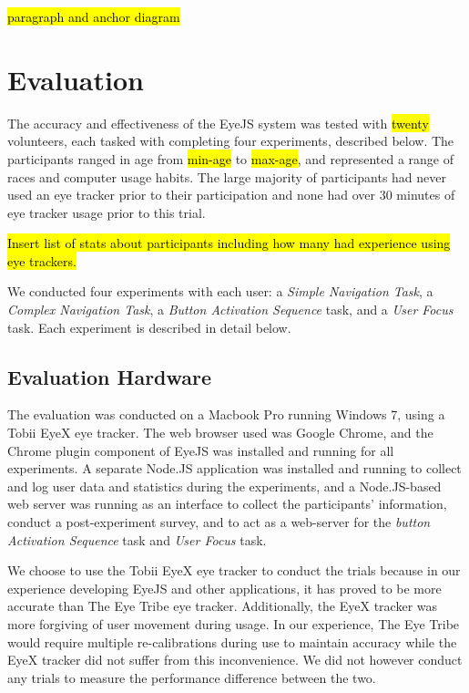 \documentclass{sigchi}
\begin{document}
\hl{paragraph and anchor diagram}



\section{Evaluation}
The accuracy and effectiveness of the EyeJS system was tested with 
\hl{twenty} volunteers, each tasked with completing four experiments,
described below. The participants ranged in age from \hl{min-age} to 
\hl{max-age}, and represented a range of races and computer usage habits.
The large majority of participants had never used an eye tracker prior
to their participation and none had over 30 minutes of eye tracker usage
prior to this trial.

\hl{Insert list of stats about participants including how many had
experience using eye trackers.}

We conducted four experiments with each user: a \emph{Simple 
Navigation Task}, a \emph{Complex Navigation Task}, a \emph{Button 
Activation Sequence} task, and a \emph{User Focus} task. Each 
experiment is described in detail below.

\subsection{Evaluation Hardware}
The evaluation was conducted on a Macbook Pro running Windows 7,
using a Tobii EyeX eye tracker. The web browser used was Google Chrome,
and the Chrome plugin component of EyeJS was installed and running for
all experiments. A separate Node.JS application was installed
and running to collect and log user data and statistics during the 
experiments, and a Node.JS-based web server was running as an interface
to collect the participants' information, conduct a post-experiment 
survey, and to act as a web-server for the \emph{button Activation Sequence}
task and \emph{User Focus} task.

We choose to use the Tobii EyeX eye tracker to conduct the trials
because in our experience developing EyeJS and other applications, 
it has proved to be more accurate than The Eye Tribe eye tracker. 
Additionally, the EyeX tracker was more forgiving of user movement
during usage. In our experience, The Eye Tribe would require multiple 
re-calibrations during use to maintain accuracy while the EyeX 
tracker did not suffer from this inconvenience. We did 
not however conduct any trials to measure the performance 
difference between the two. 
\end{document}
